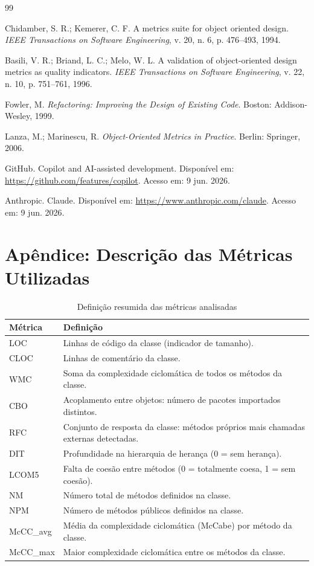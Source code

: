 \documentclass[12pt]{article}
\begin{document}
\begin{thebibliography}{99}

Chidamber, S. R.; Kemerer, C. F. A metrics suite for object oriented design.
\textit{IEEE Transactions on Software Engineering}, v. 20, n. 6, p. 476--493, 1994.

Basili, V. R.; Briand, L. C.; Melo, W. L. A validation of object-oriented design metrics as quality indicators.
\textit{IEEE Transactions on Software Engineering}, v. 22, n. 10, p. 751--761, 1996.

Fowler, M. \textit{Refactoring: Improving the Design of Existing Code}. Boston: Addison-Wesley, 1999.

Lanza, M.; Marinescu, R. \textit{Object-Oriented Metrics in Practice}. Berlin: Springer, 2006.

GitHub. Copilot and AI-assisted development. Disponível em:
\url{https://github.com/features/copilot}. Acesso em: 9 jun. 2026.

Anthropic. Claude. Disponível em:
\url{https://www.anthropic.com/claude}. Acesso em: 9 jun. 2026.

\end{thebibliography}

\newpage
\appendix
\section{Apêndice: Descrição das Métricas Utilizadas}

\begin{table}[H]
\centering
\caption{Definição resumida das métricas analisadas}
\label{tab:metricas}
\small
\begin{tabular}{p{} p{}}
\toprule
\textbf{Métrica} & \textbf{Definição} \\
\midrule
LOC      & Linhas de código da classe (indicador de tamanho). \\
CLOC     & Linhas de comentário da classe. \\
WMC      & Soma da complexidade ciclomática de todos os métodos da classe. \\
CBO      & Acoplamento entre objetos: número de pacotes importados distintos. \\
RFC      & Conjunto de resposta da classe: métodos próprios mais chamadas externas detectadas. \\
DIT      & Profundidade na hierarquia de herança (0 = sem herança). \\
LCOM5    & Falta de coesão entre métodos (0 = totalmente coesa, 1 = sem coesão). \\
NM       & Número total de métodos definidos na classe. \\
NPM      & Número de métodos públicos definidos na classe. \\
McCC\_avg & Média da complexidade ciclomática (McCabe) por método da classe. \\
McCC\_max & Maior complexidade ciclomática entre os métodos da classe. \\
\bottomrule
\end{tabular}
\end{table}
\end{document}
